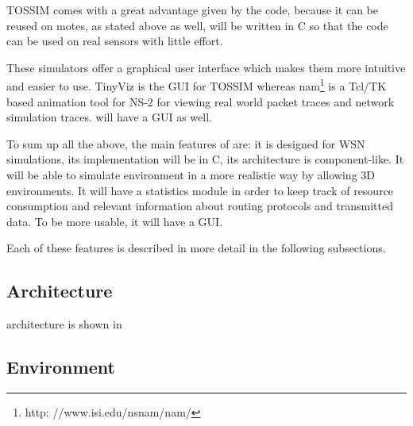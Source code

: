 TOSSIM comes with a great advantage given by the code, because it can be reused on motes,
as stated above as well, \codename will be written in C so that the code can be
used on real sensors with little effort.   

These simulators offer a graphical user interface which makes them more intuitive
and easier to use. TinyViz is the GUI for TOSSIM whereas nam\footnote{http:
//www.isi.edu/nsnam/nam/}\cite{nam} is a Tcl/TK based
animation tool for NS-2 for viewing real world packet traces and network simulation
traces. \codename will have a GUI as well.

To sum up all the above, the main features of \codename are: it is designed for WSN simulations, 
its implementation will be in C, its architecture is component-like. It will be able to simulate
environment in a more realistic way by allowing 3D environments. It will have a statistics module
in order to keep track of resource consumption and relevant information about routing protocols
and transmitted data. To be more usable, it will have a GUI. 

Each of these features is described in more detail in the following subsections.

\subsection{Architecture}
\codename architecture is shown in 

\subsection{Environment}

